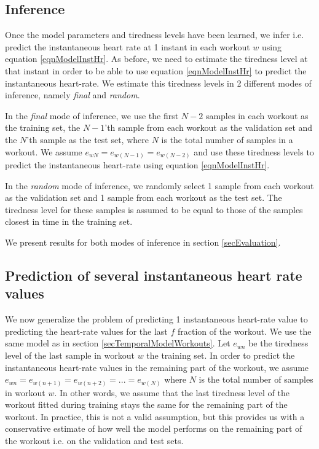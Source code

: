 \documentclass{acm_proc_article-sp}
\begin{document}
\subsection{Inference}
Once the model parameters and tiredness levels have been learned, we infer i.e. predict the instantaneous heart rate at 1 instant in each workout $w$ using equation \ref{eqnModelInstHr}. As before, we need to estimate the tiredness level at that instant in order to be able to use equation \ref{eqnModelInstHr} to predict the instantaneous heart-rate. We estimate this tiredness levels in 2 different modes of inference, namely \emph{final} and \emph{random}. 

In the \emph{final} mode of inference, we use the first $N-2$ samples in each workout as the training set, the $N-1$'th sample from each workout as the validation set and the $N$'th sample as the test set, where $N$ is the total number of samples in a workout. We assume $e_{wN} = e_{w(N-1)} = e_{w(N-2)}$ and use these tiredness levels to predict the instantaneous heart-rate using equation \ref{eqnModelInstHr}.

In the \emph{random} mode of inference, we randomly select 1 sample from each workout as the validation set and 1 sample from each workout as the test set. The tiredness level for these samples is assumed to be equal to those of the samples closest in time in the training set. 

We present results for both modes of inference in section \ref{secEvaluation}.

\subsection{Prediction of several instantaneous heart rate values}
We now generalize the problem of predicting 1 instantaneous heart-rate value to predicting the heart-rate values for the last $f$ fraction of the workout. We use the same model as in section \ref{secTemporalModelWorkouts}. Let $e_{wn}$ be the tiredness level of the last sample in workout $w$ the training set. In order to predict the instantaneous heart-rate values in the remaining part of the workout, we assume $e_{wn} = e_{w(n+1)} = e_{w(n+2)} = ... = e_{w(N)}$ where $N$ is the total number of samples in workout $w$. In other words, we assume that the last tiredness level of the workout fitted during training stays the same for the remaining part of the workout. In practice, this is not a valid assumption, but this provides us with a conservative estimate of how well the model performs on the remaining part of the workout i.e. on the validation and test sets.
\end{document}
